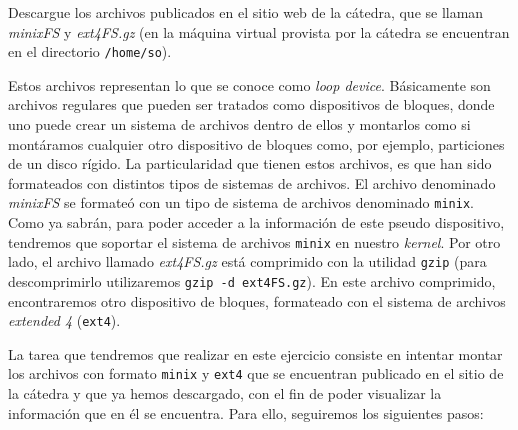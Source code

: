 \begin{questions}
  \question Descargue los archivos publicados en el sitio web de la
  cátedra, que se llaman \textit{minixFS} y \textit{ext4FS.gz} (en la
  máquina virtual provista por la cátedra se encuentran en el directorio
  \texttt{/home/so}).

  Estos archivos representan lo que se conoce como \textit{loop
    device}. Básicamente son archivos regulares que pueden ser tratados
  como dispositivos de bloques, donde uno puede crear un sistema de
  archivos dentro de ellos y montarlos como si montáramos cualquier otro
  dispositivo de bloques como, por ejemplo, particiones de un disco
  rígido. La particularidad que tienen estos archivos, es que han sido
  formateados con distintos tipos de sistemas de archivos. El archivo
  denominado \textit{minixFS} se formateó con un tipo de sistema de
  archivos denominado \texttt{minix}. Como ya sabrán, para poder acceder a
  la información de este pseudo dispositivo, tendremos que soportar el
  sistema de archivos \texttt{minix} en nuestro \textit{kernel}. Por otro lado, el
  archivo llamado \textit{ext4FS.gz} está comprimido con la utilidad
  \texttt{gzip} (para descomprimirlo utilizaremos \texttt{gzip -d
    ext4FS.gz}). En este archivo comprimido, encontraremos otro dispositivo
  de bloques, formateado con el sistema de archivos \textit{extended 4}
  (\texttt{ext4}).

  \question La tarea que tendremos que realizar en este ejercicio consiste
  en intentar montar los archivos con formato \texttt{minix} y
  \texttt{ext4} que se encuentran publicado en el sitio de la cátedra y que
  ya hemos descargado, con el fin de poder visualizar la información que en
  él se encuentra. Para ello, seguiremos los siguientes pasos:
\end{questions}
